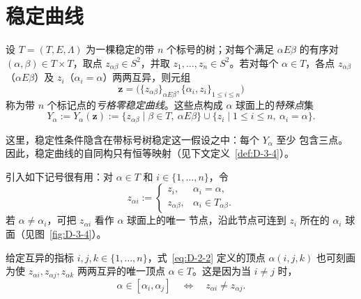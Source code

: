 
\section{稳定曲线}\label{sec:D-3}

\begin{definition}\label{def:D-3-1}
设 $T=(T,E,\Lambda)$ 为一棵稳定的带 $n$ 个标号的树；对每个满足
$\alpha E\beta$ 的有序对 $(\alpha,\beta)\in T\times T$，取点
$z_{\alpha\beta}\in S^2$，并取 $z_1,\ldots,z_n\in S^2$。若对每个
$\alpha\in T$，各点 $z_{\alpha\beta}$（$\alpha E\beta$）及
$z_i$（$\alpha_i=\alpha$）两两互异，则元组
\[
  \mathbf z=\bigl(\{z_{\alpha\beta}\}_{\alpha E\beta},
  \{\alpha_i,z_i\}_{1\le i\le n}\bigr)
\]
称为带 $n$ 个标记点的\emph{亏格零稳定曲线}。这些点构成 $\alpha$ 球面上的\emph{特殊点}集
\[
  Y_\alpha:=Y_\alpha(\mathbf z):=
  \{z_{\alpha\beta}\mid\beta\in T,\ \alpha E\beta\}
  \cup\{z_i\mid 1\le i\le n,\ \alpha_i=\alpha\}.
\]
\end{definition}

这里，稳定性条件隐含在带标号树稳定这一假设之中：每个 $Y_\alpha$ 至少
包含三点。因此，稳定曲线的自同构只有恒等映射（见下文定义~\ref{def:D-3-4}）。

\begin{remark}\label{rem:D-3-2}
引入如下记号很有用：对 $\alpha\in T$ 和 $i\in\{1,\ldots,n\}$，令
\begin{equation}\label{eq:D-3-1}
  z_{\alpha i}:=\begin{cases}
    z_i,&\alpha_i=\alpha,\\
    z_{\alpha\beta},&\alpha_i\in T_{\alpha\beta}.
  \end{cases}
\end{equation}
若 $\alpha\ne\alpha_i$，可把 $z_{\alpha i}$ 看作 $\alpha$ 球面上的唯一
节点，沿此节点可连到 $z_i$ 所在的 $\alpha_i$ 球面（见图~\ref{fig:D-3-4}）。
\end{remark}

\begin{remark}\label{rem:D-3-3}
给定互异的指标 $i,j,k\in\{1,\ldots,n\}$，式~\eqref{eq:D-2-2}
定义的顶点 $\alpha(i,j,k)$ 也可刻画为使
$z_{\alpha i},z_{\alpha j},z_{\alpha k}$ 两两互异的唯一顶点
$\alpha\in T$。这是因为当 $i\ne j$ 时，
\[
  \alpha\in[\alpha_i,\alpha_j]
  \quad\Longleftrightarrow\quad z_{\alpha i}\ne z_{\alpha j}.
\]
\end{remark}

